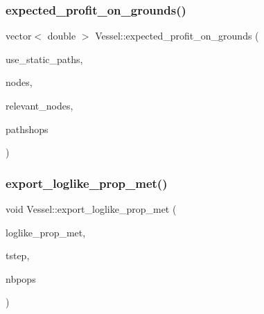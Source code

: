 \mbox{\label{class_vessel_a341eb4ca604b51a96f4eefcdd9a3cca8}} 
\subsubsection{\texorpdfstring{expected\_profit\_on\_grounds()}{expected\_profit\_on\_grounds()}}
{\footnotesize\ttfamily vector$<$ double $>$ Vessel\+::expected\+\_\+profit\+\_\+on\+\_\+grounds (\begin{DoxyParamCaption}\item[{int}]{use\+\_\+static\+\_\+paths,  }\item[{vector$<$ \mbox{\hyperlink{class_node}{Node}} $\ast$ $>$ \&}]{nodes,  }\item[{const std\+::vector$<$ \mbox{\hyperlink{classtypes_1_1_node_id}{types\+::\+Node\+Id}} $>$ \&}]{relevant\+\_\+nodes,  }\item[{const std\+::vector$<$ \mbox{\hyperlink{class_path_shop}{Path\+Shop}} $>$ \&}]{pathshops }\end{DoxyParamCaption})}

\mbox{\label{class_vessel_a60a2f2364bc62b790027839d42adb790}} 
\subsubsection{\texorpdfstring{export\_loglike\_prop\_met()}{export\_loglike\_prop\_met()}}
{\footnotesize\ttfamily void Vessel\+::export\+\_\+loglike\+\_\+prop\+\_\+met (\begin{DoxyParamCaption}\item[{std\+::ofstream \&}]{loglike\+\_\+prop\+\_\+met,  }\item[{int}]{tstep,  }\item[{int}]{nbpops }\end{DoxyParamCaption})}

\mbox{\label{class_vessel_a9e268e15ce2dfd85b3566fc23da114f7}} 
